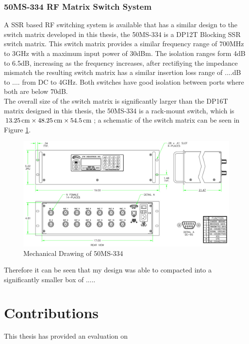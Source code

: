 \documentclass[12pt,openany,a4paper]{book}
\newcommand{\cm}	{\ensuremath{\rm\,cm}}
\begin{document}
\subsubsection{50MS-334 RF Matrix Switch System}
A SSR based RF switching system is available that has a similar design to the switch matrix developed in this thesis, the 50MS-334 is a DP12T Blocking SSR switch matrix. This switch matrix provides a similar frequency range of $700$MHz to $3$GHz with a maximum input power of $30$dBm. The isolation ranges form 4dB to 6.5dB, increasing as the frequency increases, after rectifiying the impedance mismatch the resulting switch matrix has a similar insertion loss range of $....$dB to $....$ from DC to 4GHz. Both switches have good isolation between ports where both are below $70$dB.\\
The overall size of the switch matrix is significantly larger than the DP16T matrix designed in this thesis, the 50MS-334 is a rack-mount switch, which is $13.25\cm \times 48.25\cm \times 54.5\cm$; a schematic of the switch matrix can be seen in Figure \ref{fig:50ms-mechanical}.
\begin{figure}[H]
	\centering
    \includegraphics[width=1\textwidth]{ssr-alternative.png}
	\caption{Mechanical Drawing of 50MS-334}
	\label{fig:50ms-mechanical}
\end{figure} 
Therefore it can be seen that my design was able to compacted into a significantly smaller box of .....


\section{Contributions}
This thesis has provided an evaluation on 




\end{document}
